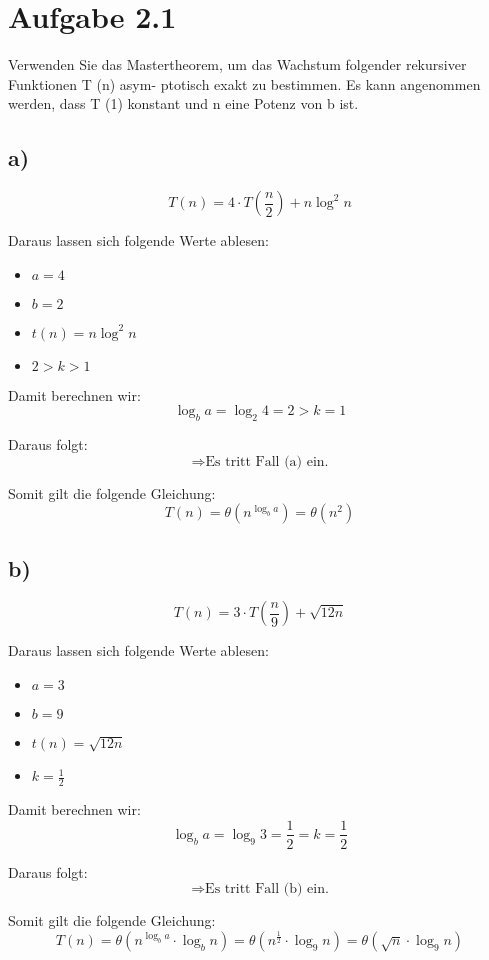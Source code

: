 \documentclass[a4paper]{article}
\begin{document}
\section*{Aufgabe 2.1}
Verwenden Sie das Mastertheorem, um das Wachstum folgender rekursiver Funktionen T (n) asym-
ptotisch exakt zu bestimmen. Es kann angenommen werden, dass T (1) konstant und n eine Potenz
von b ist.
\subsection*{a)}
\[ T(n) = 4 \cdot T\left(\frac{n}{2}\right) + n \log^2 n \]

Daraus lassen sich folgende Werte ablesen:
\begin{itemize}
    \item $a = 4$
    \item $b = 2$
    \item $t(n) = n \log^2 n$
    \item $2 > k > 1$
\end{itemize}

Damit berechnen wir:
\[ \log_b a = \log_2 4 = 2 > k = 1 \]

Daraus folgt:
\[
\Rightarrow \text{Es tritt Fall (a) ein.}
\]

Somit gilt die folgende Gleichung:
\[ T(n) = \theta\left(n^{\log_{b}a}\right) = \theta\left(n^2\right)\]



\subsection*{b)}
\[ T(n) = 3 \cdot T\left(\frac{n}{9}\right) + \sqrt{12n} \]

Daraus lassen sich folgende Werte ablesen:
\begin{itemize}
    \item $a = 3$
    \item $b = 9$
    \item $t(n) = \sqrt{12n}$
    \item $k = \frac{1}{2}$
\end{itemize}

Damit berechnen wir:
\[ \log_b a = \log_9 3 = \frac{1}{2} = k = \frac{1}{2} \]

Daraus folgt:
\[
\Rightarrow \text{Es tritt Fall (b) ein.}
\]

Somit gilt die folgende Gleichung:
\[ T(n) = \theta\left(n^{\log_{b}a} \cdot \log_{b}n \right) = \theta\left(n^{\frac{1}{2}} \cdot  \log_{9}n \right) =  \theta\left(\sqrt{n} \cdot  \log_{9}n \right)\]
\end{document}
